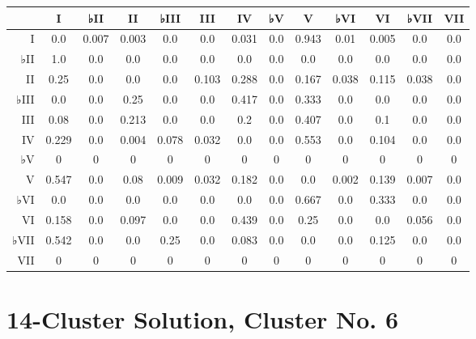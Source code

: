 \begin{table}[htbp]
\begin{minipage}{\linewidth}
\setlength{\tymax}{0.5\linewidth}
\centering
\small
\begin{tabulary}{\textwidth}{@{}RCCCCCCCCCCCC@{}} \toprule
&I&♭II&II&♭III&III&IV&♭V&V&♭VI&VI&♭VII&VII\\
\midrule
I&0.0&0.007&0.003&0.0&0.0&0.031&0.0&0.943&0.01&0.005&0.0&0.0\\
♭II&1.0&0.0&0.0&0.0&0.0&0.0&0.0&0.0&0.0&0.0&0.0&0.0\\
II&0.25&0.0&0.0&0.0&0.103&0.288&0.0&0.167&0.038&0.115&0.038&0.0\\
♭III&0.0&0.0&0.25&0.0&0.0&0.417&0.0&0.333&0.0&0.0&0.0&0.0\\
III&0.08&0.0&0.213&0.0&0.0&0.2&0.0&0.407&0.0&0.1&0.0&0.0\\
IV&0.229&0.0&0.004&0.078&0.032&0.0&0.0&0.553&0.0&0.104&0.0&0.0\\
♭V&0&0&0&0&0&0&0&0&0&0&0&0\\
V&0.547&0.0&0.08&0.009&0.032&0.182&0.0&0.0&0.002&0.139&0.007&0.0\\
♭VI&0.0&0.0&0.0&0.0&0.0&0.0&0.0&0.667&0.0&0.333&0.0&0.0\\
VI&0.158&0.0&0.097&0.0&0.0&0.439&0.0&0.25&0.0&0.0&0.056&0.0\\
♭VII&0.542&0.0&0.0&0.25&0.0&0.083&0.0&0.0&0.0&0.125&0.0&0.0\\
VII&0&0&0&0&0&0&0&0&0&0&0&0\\

\bottomrule

\end{tabulary}
\end{minipage}
\end{table}

\section{14-Cluster Solution, Cluster No. 6}
\label{14-clustersolutionclusterno.6}

